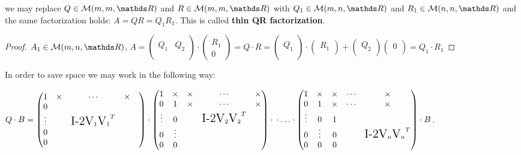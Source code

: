 \documentclass[computational_mathematics.tex]{subfiles}
\begin{document}
\begin{proposition} 
  we may replace $Q \in \mathcal{M}(m, m, \R)$ and $R \in \mathcal{M}(m, m, \R)$ with $Q_1 \in \mathcal{M}(m, n, \R)$ and $R_1 \in \mathcal{M}(n, n, \R)$ and the same factorization holds: $A=QR=Q_1R_1$. This is called \textbf{thin QR factorization}.
\end{proposition}
\begin{proof}
 $A_{1} \in \mathcal{M}(m, n, \R)$, $ A =\begin{pmatrix}
    &\\
    Q_{1} & Q_{2}\\
    &\\
  \end{pmatrix}
  \cdot
  \begin{pmatrix}
    R_{1}\\
    0
  \end{pmatrix}
  =
  Q \cdot R
  =
  \begin{pmatrix}
   \\
    Q_{1}\\
    \\
  \end{pmatrix}
  \cdot
  \begin{pmatrix}
    R_{1}\\
  \end{pmatrix}
  +
  \begin{pmatrix}
    Q_{2}\\
  \end{pmatrix}
  \begin{pmatrix}
    0\\
  \end{pmatrix}
  =
  Q_{1} \cdot R_{1}$
\end{proof}
In order to save space we may work in the following way:

$Q \cdot B =
  \begin{pmatrix}
    1 & \times &\cdots & \times\\
    0 &&&&\\
    \vdots &&\text{\Large I-2V}_1 {\text{\Large V}_1}^{T}&\\
    0 &&&&\\
    0 &&&&
  \end{pmatrix} \cdot 
  \begin{pmatrix}
    1 & \times & \times & \cdots & \times\\
    0 & 1 &\times & \cdots& \times\\
    \vdots & 0 &&\text{\Large I-2V}_2 {\text{\Large V}_2}^{T}\\
    0 & \vdots &&&\\
    0 & 0 &&
  \end{pmatrix}\cdot\\ \cdot \ldots \cdot
  \begin{pmatrix}
    1 & \times & \times & \cdots & \times\\
    0 & 1 & \times & \cdots & \times\\
    \vdots & 0 & 1 &\\
    0 & \vdots & 0 &&\text{\Large I-2V}_n {\text{\Large V}_n}^{T}\\
    0 & 0 & 0 &
  \end{pmatrix} \cdot B$.
\end{document}
